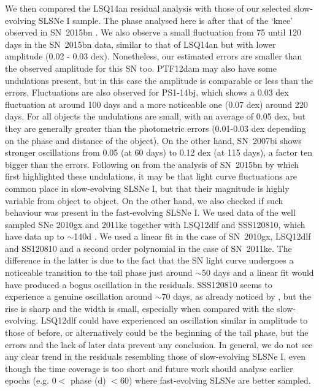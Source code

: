 \documentclass[useAMS,usenatbib]{mn2e}
\def\an{LSQ14an}
\begin{document}
We then compared the \an\/ residual analysis with those of our selected slow-evolving SLSNe I sample. The phase analysed here is after that of the `knee' observed in SN~2015bn \citep{ni16a}. We also observe a small fluctuation from 75 until 120 days in  the SN~2015bn data, similar to that of \an\/ but with lower amplitude (0.02 - 0.03 dex). Nonetheless,  our estimated errors are smaller than the observed amplitude for this SN too.  PTF12dam may also have some undulations present,
 but in this case the amplitude is comparable or less than the errors. Fluctuations are also observed for PS1-14bj, which shows a 0.03 dex fluctuation at around 100 days and a more noticeable one (0.07 dex) around 220 days. For all  objects the undulations are small, with an average of 0.05 dex, but they are  generally greater than the photometric errors (0.01-0.03 dex depending on the phase and distance of the object). On the other hand, SN~2007bi shows stronger oscillations from 0.05 (at 60 days) to 0.12 dex (at 115 days), a factor ten bigger than the errors. Following on from the analysis of SN~2015bn by 
\cite{ni16a} which first highlighted these undulations, it may be that 
light curve fluctuations are common place in slow-evolving SLSNe I, but that their magnitude is highly variable from 
object to object. 
On the other hand, we also checked if such behaviour was present in the fast-evolving SLSNe I. We used data of the well sampled SNe 2010gx and 2011ke \citep{pa10,in13} together with LSQ12dlf and SSS120810, which have data up to $\sim$140d \citep{ni14}. We used a linear fit in the case of SN~2010gx, LSQ12dlf and SS120810 and a second order polynomial in the case of SN~2011ke. The difference in the latter is due to the fact that the SN light curve undergoes a noticeable transition to 
 the tail phase just around $\sim$50 days \citep[see][]{in13} and a linear fit would have produced a bogus oscillation in the residuals. SSS120810 seems to experience a genuine oscillation around $\sim$70 days, as already noticed by \citet{ni14}, but the rise is sharp and the width is small, especially when compared with the slow-evolving. LSQ12dlf could have experienced an oscillation similar in amplitude to those of before, or alternatively could be the beginning of the tail phase, but the errors and the lack of later data prevent any conclusion.
In general, we do not see any clear trend in the residuals resembling those of slow-evolving SLSNe I, even though the time coverage is too short and future work should analyse earlier epochs (e.g. $0<$ phase (d) $<60$) where fast-evolving SLSNe are better sampled. 
\end{document}

